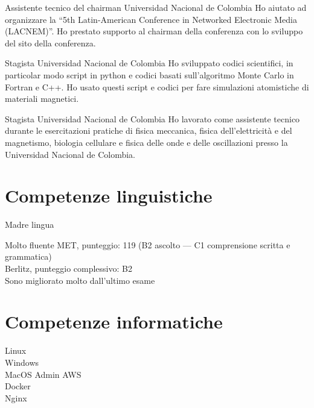 \documentclass[12pt,english]{moderncv}
\begin{document}
        {Assistente tecnico del chairman}
        {Universidad Nacional de Colombia}
        {}
        {}
        {%
            Ho aiutato ad organizzare la ``5th Latin-American Conference
            in Networked Electronic Media (LACNEM)''. 
            Ho prestato supporto al chairman della conferenza con lo sviluppo del sito della conferenza.
        }

        {Stagista}
        {Universidad Nacional de Colombia}
        {}
        {}
        {%
            Ho sviluppato codici scientifici, in particolar modo script in python e codici basati sull'algoritmo Monte Carlo in Fortran e C++. Ho usato questi script e codici per fare simulazioni atomistiche di materiali magnetici.
        }

        {Stagista}
        {Universidad Nacional de Colombia}
        {}
        {}
        {%
            Ho lavorato come assistente tecnico durante le esercitazioni pratiche di fisica meccanica, fisica dell'elettricit\`a e del magnetismo, biologia cellulare e fisica delle onde e delle oscillazioni presso la Universidad Nacional de Colombia.
        }


\section{Competenze linguistiche}

           {Madre lingua}
           {}

           {Molto fluente}
           {%
               MET, punteggio: 119 (B2 ascolto --- C1 comprensione scritta e grammatica)\\
               Berlitz, punteggio complessivo: B2\\
               Sono migliorato molto dall'ultimo esame
           }

\section{Competenze informatiche}

            {Linux\\Windows\\MacOS}
           {Admin}         {AWS\\Docker\\Nginx}
\end{document}
